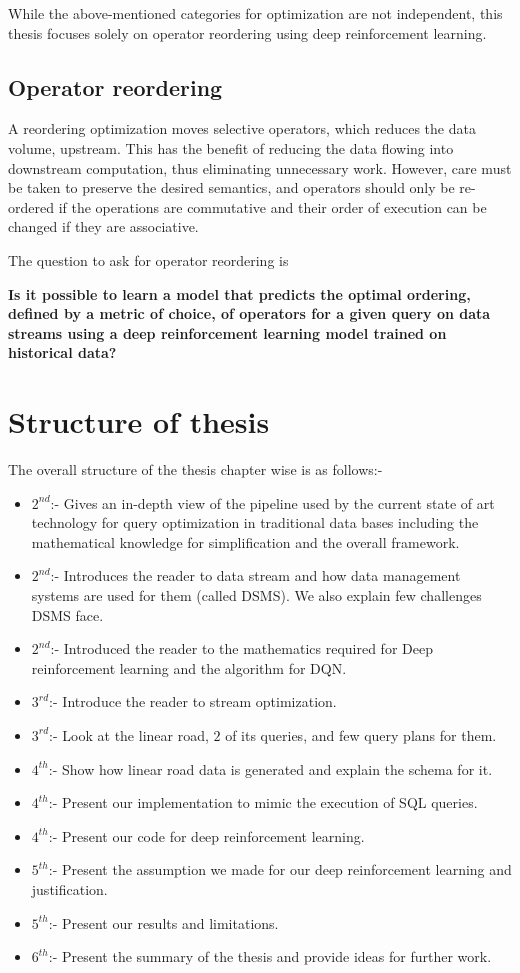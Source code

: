 While the above-mentioned categories for optimization are not independent, this thesis focuses solely on operator reordering using deep reinforcement learning. 

\subsection{Operator reordering}
A reordering optimization moves selective operators, which reduces the data volume, upstream. This has the benefit of reducing the data flowing into downstream computation, thus eliminating unnecessary work. However, care must be taken to preserve the desired semantics, and operators should only be re-ordered if the operations are commutative and their order of execution can be changed if they are associative. \cite{stream_query_optimization}
\par The question to ask for operator reordering is
\begin{center}
    \textbf{Is it possible to learn a model that predicts the optimal ordering, defined by a metric of choice, of operators for a given query on data streams using a deep reinforcement learning model trained on historical data?}
\end{center}
\section{Structure of thesis}
\label{sec:Structure of thesis}
The overall structure of the thesis chapter wise is as follows:-
\begin{itemize}
    \item $2^{nd}$:- Gives an in-depth view of the pipeline used by the current state of art technology for query optimization in traditional data bases including the mathematical knowledge for simplification and the overall framework.
    \item $2^{nd}$:- Introduces the reader to data stream and how data management systems are used for them (called DSMS). We also explain few challenges DSMS face.
    \item $2^{nd}$:- Introduced the reader to the mathematics required for Deep reinforcement learning and the algorithm for DQN.
    \item $3^{rd}$:- Introduce the reader to stream optimization.
    \item $3^{rd}$:- Look at the linear road, $2$ of its queries, and few query plans for them.
    \item $4^{th}$:- Show how linear road data is generated and explain the schema for it.
    \item $4^{th}$:- Present our implementation to mimic the execution of SQL queries.
    \item $4^{th}$:- Present our code for deep reinforcement learning.
    \item $5^{th}$:- Present the assumption we made for our deep reinforcement learning and justification.
    \item $5^{th}$:- Present our results and limitations.
    \item $6^{th}$:- Present the summary of the thesis and provide ideas for further work.
\end{itemize}

